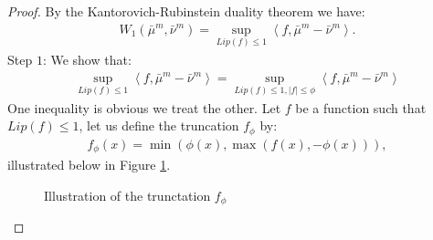 \documentclass[11pt,a4paper]{article}
\newcommand{\brac}[1]{\left\langle#1\right\rangle}
\begin{document}
\begin{proof}
    By the Kantorovich-Rubinstein duality theorem we have:
    \begin{align*}
        W_1(\bar{\mu}^m,\bar{\nu}^m) = \sup\limits_{Lip(f) \leq 1} \brac{f,\bar{\mu}^m - \bar{\nu}^m} .
    \end{align*}
    Step $1$: We show that:
    \begin{align*}
        \sup\limits_{Lip(f) \leq 1} \brac{f,\bar{\mu}^m - \bar{\nu}^m} = \sup\limits_{Lip(f) \leq 1,|f| \leq \phi} \brac{f,\bar{\mu}^m - \bar{\nu}^m}
    \end{align*}
    One inequality is obvious we treat the other. Let $f$ be a function such that $Lip(f) \leq 1$, let us define the truncation $f_\phi$ by:
    \begin{align*}
        f_\phi(x) = \min(\phi(x),\max(f(x),-\phi(x))),
    \end{align*}
    illustrated below in Figure \ref{fig:illustration-of-truncation}.
    \begin{center}
  \begin{figure}[h]
    \centering
    \pgfplotsset{compat=1.18}
    \caption{Illustration of the trunctation $f_\phi$}
    \label{fig:illustration-of-truncation}
  \end{figure}
  \begin{figure}[ht]
\centering


\end{figure}
\end{center}
\end{proof}
\end{document}
